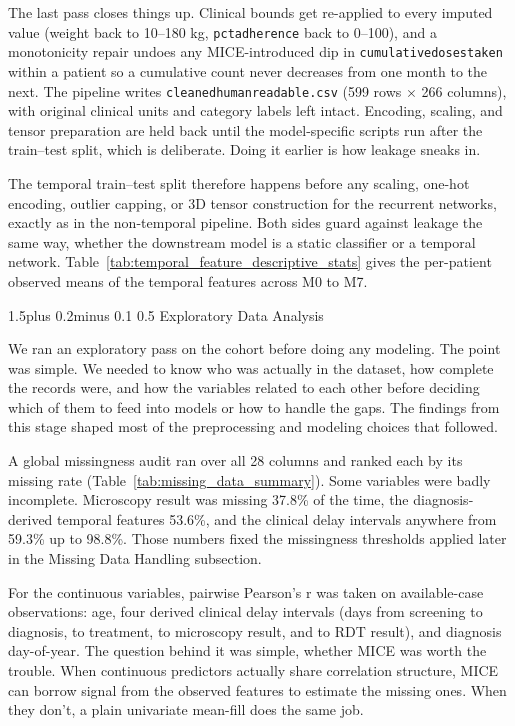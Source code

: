 \documentclass[12pt]{article}
\makeatletter
\renewcommand{\_}{\textunderscore\allowbreak}
\renewcommand{\subsection}{\@startsection{subsection}{2}{0pt}%
  {1.5\baselineskip plus 0.2\baselineskip minus 0.1\baselineskip}%
  {0.5\baselineskip}%
  {\bfseries\normalsize}}
\makeatother
\begin{document}
The last pass closes things up. Clinical bounds get re-applied to every imputed value (weight back to 10--180 kg, \texttt{pct\_adherence} back to 0--100), and a monotonicity repair undoes any MICE-introduced dip in \texttt{cumulative\_doses\_taken} within a patient so a cumulative count never decreases from one month to the next. The pipeline writes \texttt{cleaned\_human\_readable.csv} (599 rows $\times$ 266 columns), with original clinical units and category labels left intact. Encoding, scaling, and tensor preparation are held back until the model-specific scripts run after the train--test split, which is deliberate. Doing it earlier is how leakage sneaks in.

The temporal train--test split therefore happens before any scaling, one-hot encoding, outlier capping, or 3D tensor construction for the recurrent networks, exactly as in the non-temporal pipeline. Both sides guard against leakage the same way, whether the downstream model is a static classifier or a temporal network. Table~\ref{tab:temporal_feature_descriptive_stats} gives the per-patient observed means of the temporal features across M0 to M7.



\FloatBarrier

\subsection{Exploratory Data Analysis}

We ran an exploratory pass on the cohort before doing any modeling. The point was simple. We needed to know who was actually in the dataset, how complete the records were, and how the variables related to each other before deciding which of them to feed into models or how to handle the gaps. The findings from this stage shaped most of the preprocessing and modeling choices that followed.



A global missingness audit ran over all 28 columns and ranked each by its missing rate (Table~\ref{tab:missing_data_summary}). Some variables were badly incomplete. Microscopy result was missing 37.8\% of the time, the diagnosis-derived temporal features 53.6\%, and the clinical delay intervals anywhere from 59.3\% up to 98.8\%. Those numbers fixed the missingness thresholds applied later in the Missing Data Handling subsection.

For the continuous variables, pairwise Pearson's r was taken on available-case observations: age, four derived clinical delay intervals (days from screening to diagnosis, to treatment, to microscopy result, and to RDT result), and diagnosis day-of-year. The question behind it was simple, whether MICE was worth the trouble. When continuous predictors actually share correlation structure, MICE can borrow signal from the observed features to estimate the missing ones. When they don't, a plain univariate mean-fill does the same job.
\end{document}
